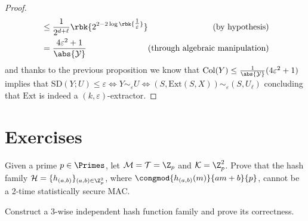 \documentclass[a4paper, 12pt]{report}
\begin{document}
\begin{proof}
\begin{equation*}
\begin{alignedat}{2}
			              & \le \dfrac{1}{2^{d + \ell}}\rbk{2^{2 - 2 \log \rbk{\tfrac{1}{\varepsilon}}}} & \quad (\mbox{by hypothesis})            \\
			              & = \dfrac{4\varepsilon^2 +1}{\abs{\mathcal Y}}                                & (\mbox{through algebraic manipulation}) \\
		\end{alignedat}
	\end{equation*}
	and thanks to the previous proposition we know that $\mbox{Col}(Y) \le \tfrac{1}{\abs{\mathcal Y}}(4\varepsilon^2 + 1)$ implies that $\mbox{SD}(Y;U) \le \varepsilon \iff Y \sim_\varepsilon U \iff (S, \mbox{Ext}(S, X)) \sim_\varepsilon (S, U_\ell)$ concluding that $\mbox{Ext}$ is indeed a $(k, \varepsilon)$-extractor.
\end{proof}

\section{Exercises}

\begin{framedprob}{}
	Given a prime $p \in \Primes$, let $\mathcal M = \mathcal T = \Z_p$ and $\mathcal K = \Z_p^2$. Prove that the hash family $\mathcal H = \{h_{(a, b)}\}_{(a, b) \in \Z_p^2}$, where $\congmod{h_{(a, b)}(m)}{am + b}{p}$, cannot be a 2-time statistically secure MAC.
\end{framedprob}


\begin{framedprob}{}
	Construct a 3-wise independent hash function family and prove its correctness.
\end{framedprob}


\end{document}
